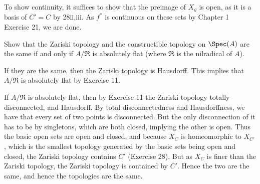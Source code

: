 \documentclass[a4paper]{exam}
\newif\ifhint
\begin{document}
\begin{questions}
\begin{solution}
	To show continuity, it suffices to show that the preimage of $X_g$ is open, as it is a basis of $C'=C$ by 28ii,iii.
	As $f^\ast $ is continuous on these sets by Chapter 1 Exercise 21, we are done.
\end{solution}

\question Show that the Zariski topology and the constructible topology on $\Spec(A) $ are the same if and only if $A / \mathfrak{R} $ is absolutely flat (where $\mathfrak{R} $ is the nilradical of $A $).
\ifhint
	Use Exercise 11.
\fi
\begin{solution}
	If they are the same, then the Zariski topology is Hausdorff.
	This implies that $A / \mathfrak{R} $ is absolutely flat by Exercise 11.

	If $A / \mathfrak{R} $ is absolutely flat, then by Exercise 11 the Zariski topology totally disconnected, and Hausdorff.
	By total disconnectedness and Hausdorffness, we have that every set of two points is disconnected.
	But the only disconnection of it has to be by singletons, which are both closed, implying the other is open.
	Thus the basic open sets are open and closed, and because $X_C $ is homeomorphic to $X_{C'} $, which is the smallest topology generated by the basic sets being open and closed, the Zariski topology contains $C' $ (Exercise 28).
	But as $X_C $ is finer than the Zariski topology, the Zariski topology is contained by $C'$.
	Hence the two are the same, and hence the topologies are the same.
\end{solution}
\end{questions}
\end{document}
